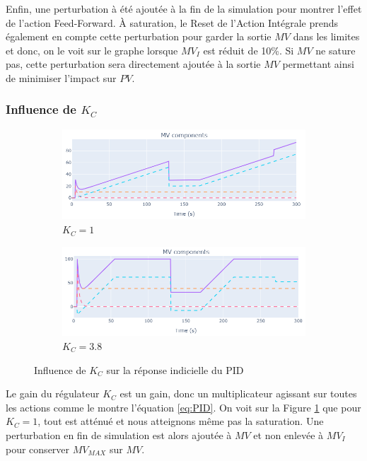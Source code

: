 Enfin, une perturbation à été ajoutée à la fin de la simulation pour montrer l'effet de l'action Feed-Forward.
À saturation, le Reset de l'Action Intégrale prends également en compte cette perturbation pour garder la sortie $MV$ dans les limites et donc, on le voit sur le graphe lorsque $MV_I$ est réduit de 10\%.
Si $MV$ ne sature pas, cette perturbation sera directement ajoutée à la sortie $MV$ permettant ainsi de minimiser l'impact sur $PV$.

\subsubsection{Influence de \texorpdfstring{$K_C$}{Kc}}\label{ssec:Kc_Influence_PID}
\begin{figure}[H]
    \centering
    \begin{subfigure}[b]{0.48\textwidth}
        \includegraphics[width=\textwidth]{../Plots/PID/PID_Response_low_Kc.png}
        \caption{$K_C = 1$}
    \end{subfigure}
    \begin{subfigure}[b]{0.48\textwidth}
        \includegraphics[width=\textwidth]{../Plots/PID/PID_Response_high_Kc.png}
        \caption{$K_C = 3.8$}
    \end{subfigure}
    \caption{Influence de $K_C$ sur la réponse indicielle du PID}
    \label{fig:Kc_Influence_PID}
\end{figure}
Le gain du régulateur $K_C$ est un gain, donc un multiplicateur agissant sur toutes les actions comme le montre l'équation \eqref{eq:PID}.
On voit sur la Figure \ref{fig:Kc_Influence_PID} que pour $K_C = 1$, tout est atténué et nous atteignons même pas la saturation.
Une perturbation en fin de simulation est alors ajoutée à $MV$ et non enlevée à $MV_I$ pour conserver $MV_{MAX}$ sur $MV$.

